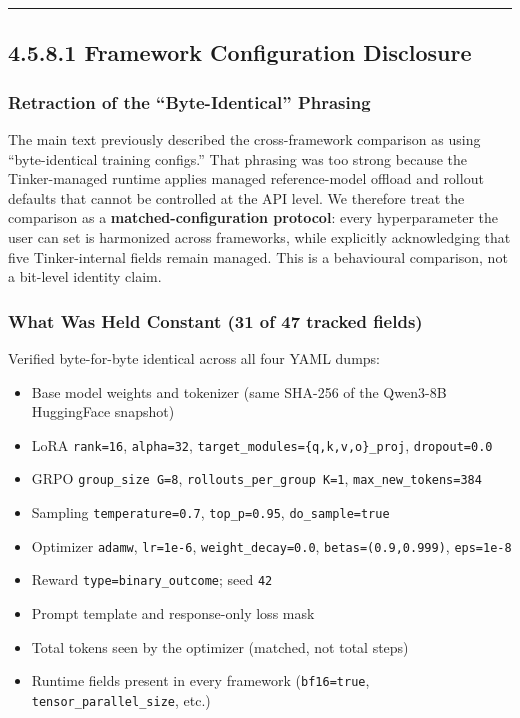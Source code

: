 \documentclass[
  american,
  11pt,
  a4paper,
  oneside]{report}
\providecommand{\tightlist}{%
  \setlength{\itemsep}{0pt}\setlength{\parskip}{0pt}}
\begin{document}
\begin{center}\rule{0.5\linewidth}{0.5pt}\end{center}

\subsection{4.5.8.1 Framework Configuration
Disclosure}\label{framework-configuration-disclosure}

\subsubsection{Retraction of the ``Byte-Identical''
Phrasing}\label{retraction-of-the-byte-identical-phrasing}

The main text previously described the cross-framework comparison as
using ``byte-identical training configs.'' That phrasing was too strong
because the Tinker-managed runtime applies managed reference-model
offload and rollout defaults that cannot be controlled at the API level.
We therefore treat the comparison as a \textbf{matched-configuration
protocol}: every hyperparameter the user can set is harmonized across
frameworks, while explicitly acknowledging that five Tinker-internal
fields remain managed. This is a behavioural comparison, not a bit-level
identity claim.

\subsubsection{What Was Held Constant (31 of 47 tracked
fields)}\label{what-was-held-constant-31-of-47-tracked-fields}

Verified byte-for-byte identical across all four YAML dumps:

\begin{itemize}
\tightlist
\item
  Base model weights and tokenizer (same SHA-256 of the Qwen3-8B
  HuggingFace snapshot)
\item
  LoRA \texttt{rank=16}, \texttt{alpha=32},
  \texttt{target\_modules=\{q,k,v,o\}\_proj}, \texttt{dropout=0.0}
\item
  GRPO \texttt{group\_size\ G=8}, \texttt{rollouts\_per\_group\ K=1},
  \texttt{max\_new\_tokens=384}
\item
  Sampling \texttt{temperature=0.7}, \texttt{top\_p=0.95},
  \texttt{do\_sample=true}
\item
  Optimizer \texttt{adamw}, \texttt{lr=1e-6},
  \texttt{weight\_decay=0.0}, \texttt{betas=(0.9,0.999)},
  \texttt{eps=1e-8}
\item
  Reward \texttt{type=binary\_outcome}; seed \texttt{42}
\item
  Prompt template and response-only loss mask
\item
  Total tokens seen by the optimizer (matched, not total steps)
\item
  Runtime fields present in every framework (\texttt{bf16=true},
  \texttt{tensor\_parallel\_size}, etc.)
\end{itemize}
\end{document}
